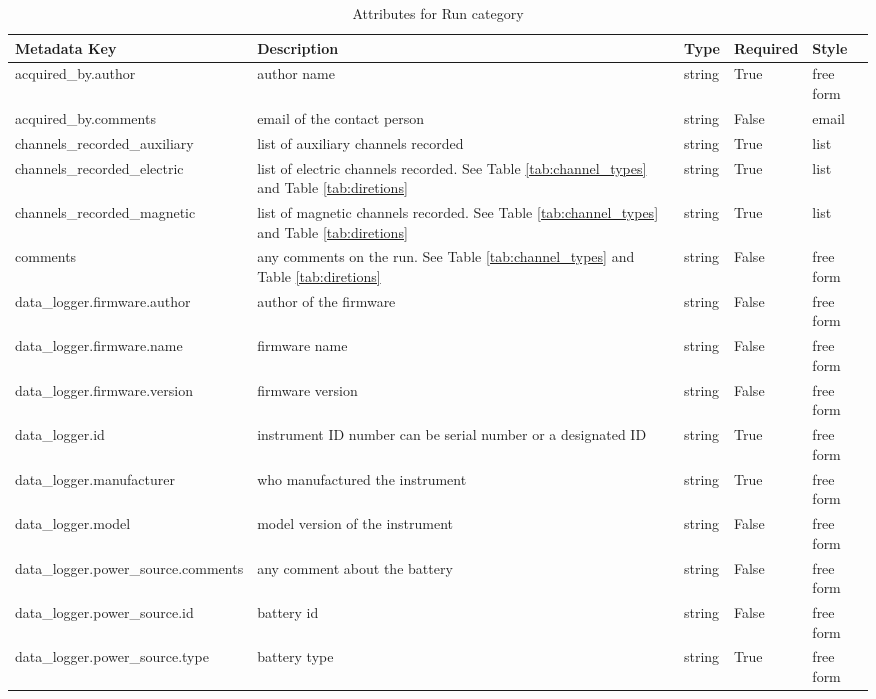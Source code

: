 \documentclass{article}
\begin{document}
\begin{table}[h!]
    \caption[Attributes for Run]{Attributes for Run category}
    \begin{tabular}{|l|p{2.55in}|l|l|p{.95in}|}
        \hline
       \textbf{Metadata Key} & \textbf{Description} & \textbf{Type} & \textbf{Required} & \textbf{Style}\\ \hline acquired\_by.author & author name & string & True & free form  \\ \hline
       acquired\_by.comments & email of the contact person & string & False & email  \\ \hline
       channels\_recorded\_auxiliary & list of auxiliary channels recorded & string & True & list  \\ \hline
       channels\_recorded\_electric & list of electric channels recorded. See Table \ref{tab:channel_types} and Table \ref{tab:diretions} & string & True & list  \\ \hline
       channels\_recorded\_magnetic & list of magnetic channels recorded. See Table \ref{tab:channel_types}  and Table \ref{tab:diretions} & string & True & list  \\ \hline
       comments & any comments on the run. See Table \ref{tab:channel_types}  and Table \ref{tab:diretions} & string & False & free form  \\ \hline
       data\_logger.firmware.author & author of the firmware & string & False & free form  \\ \hline
       data\_logger.firmware.name & firmware name & string & False & free form  \\ \hline
       data\_logger.firmware.version & firmware version & string & False & free form  \\ \hline
       data\_logger.id & instrument ID number can be serial number or a designated ID & string & True & free form  \\ \hline
       data\_logger.manufacturer & who manufactured the instrument & string & True & free form  \\ \hline
       data\_logger.model & model version of the instrument & string & False & free form  \\ \hline
       data\_logger.power\_source.comments & any comment about the battery & string & False & free form  \\ \hline
       data\_logger.power\_source.id & battery id & string & False & free form\\ \hline
       data\_logger.power\_source.type & battery type & string & True & free form  \\ \hline

\end{tabular}
\end{table}
\end{document}
